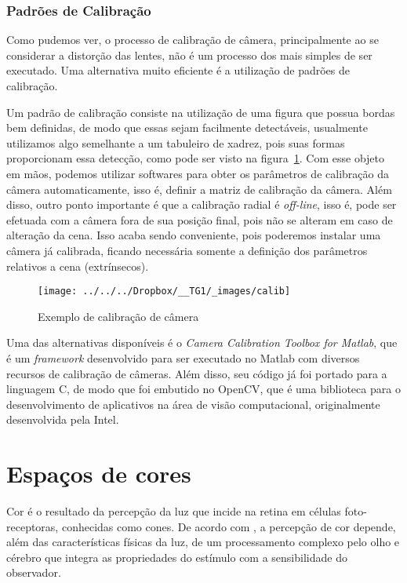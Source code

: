\documentclass[ecp,tc]{iiufrgs}
\begin{document}
\subsubsection{Padrões de Calibração}

Como pudemos ver, o processo de calibração de câmera, principalmente ao se considerar a distorção das lentes, não é um processo dos mais simples de ser executado. Uma alternativa muito eficiente é a utilização de padrões de calibração.

Um padrão de calibração consiste na utilização de uma figura que possua bordas bem definidas, de modo que essas sejam facilmente detectáveis, usualmente utilizamos algo semelhante a um tabuleiro de xadrez, pois suas formas proporcionam essa detecção, como pode ser visto na figura~\ref{fig:calib}. Com esse objeto em mãos, podemos utilizar softwares para obter os parâmetros de calibração da câmera automaticamente, isso é, definir a matriz de calibração da câmera. Além disso, outro ponto importante é que a calibração radial é \textit{off-line}, isso é, pode ser efetuada com a câmera fora de sua posição final, pois não se alteram em caso de alteração da cena. Isso acaba sendo conveniente, pois poderemos instalar uma câmera já calibrada, ficando necessária somente a definição dos parâmetros relativos a cena (extrínsecos).

\begin{figure}
	\centering
	\caption{Exemplo de calibração de câmera}
	\texttt{[image: ../../../Dropbox/\_\_TG1/\_images/calib]}
	\label{fig:calib}
\end{figure}

Uma das alternativas disponíveis é o \textit{Camera Calibration Toolbox for Matlab}, que é um \textit{framework} desenvolvido para ser executado no Matlab com diversos recursos de calibração de câmeras. Além disso, seu código já foi portado para a linguagem C, de modo que foi embutido no OpenCV, que é uma biblioteca para o desenvolvimento de aplicativos na área de visão computacional, originalmente desenvolvida pela Intel.

\section{Espaços de cores}

Cor é o resultado da percepção da luz que incide na retina em células foto-receptoras, conhecidas como cones. De acordo com , a percepção de cor depende, além das características físicas da luz, de um processamento complexo pelo olho e cérebro que integra as propriedades do estímulo com a sensibilidade do observador.
\end{document}
